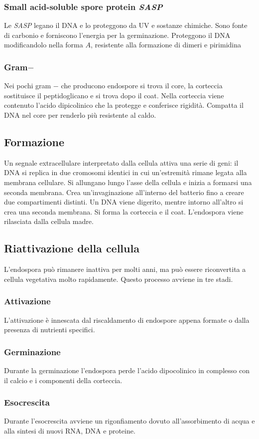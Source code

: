 		\subsubsection{Small acid-soluble spore protein \emph{SASP}}
		Le \emph{SASP} legano il DNA e lo proteggono da UV e sostanze chimiche.
		Sono fonte di carbonio e forniscono l'energia per la germinazione.
		Proteggono il DNA modificandolo nella forma $A$, resistente alla formazione di dimeri e pirimidina

		\subsubsection{Gram$\mathbf{-}$}
		Nei pochi gram $-$ che producono endospore si trova il core, la corteccia sostituisce il peptidoglicano e si trova dopo il coat.
		Nella corteccia viene contenuto l'acido dipicolinico che la protegge e conferisce rigidit\`a.
		Compatta il DNA nel core per renderlo pi\`u resistente al caldo.

	\subsection{Formazione}
	Un segnale extracellulare interpretato dalla cellula attiva una serie di geni: il DNA si replica in due cromosomi identici in cui un'estremit\`a rimane legata alla membrana cellulare.
	Si allungano lungo l'asse della cellula e inizia a formarsi una seconda membrana.
	Crea un'invaginazione all'interno del batterio fino a creare due compartimenti distinti.
	Un DNA viene digerito, mentre intorno all'altro si crea una seconda membrana.
	Si forma la corteccia e il coat.
	L'endospora viene rilasciata dalla cellula madre.

	\subsection{Riattivazione della cellula}
	L'endospora pu\`o rimanere inattiva per molti anni, ma pu\`o essere riconvertita a cellula vegetativa molto rapidamente.
	Questo processo avviene in tre stadi.

		\subsubsection{Attivazione}
		L'attivazione \`e innescata dal riscaldamento di endospore appena formate o dalla presenza di nutrienti specifici.
		
		\subsubsection{Germinazione}
		Durante la germinazione l'endospora perde l'acido dipocolinico in complesso con il calcio e i componenti della corteccia.

		\subsubsection{Esocrescita}
		Durante l'esocrescita avviene un rigonfiamento dovuto all'assorbimento di acqua e alla sintesi di nuovi RNA, DNA e proteine.
